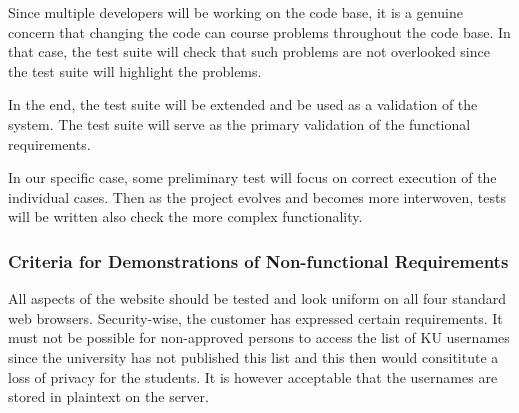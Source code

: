 \documentclass[11pt,a4paper]{report}
\begin{document}
Since multiple developers will be working on the code base, it is a genuine concern that changing the code can course problems throughout the code base. In that case, the test suite will check that such problems are not overlooked since the test suite will highlight the problems.

In the end, the test suite will be extended and be used as a validation of the system. The test suite will serve as the primary validation of the functional requirements.

In our specific case, some preliminary test will focus on correct execution of the individual cases. Then as the project evolves and becomes more interwoven, tests will be written also check the more complex functionality.

\subsubsection{Criteria for Demonstrations of Non-functional Requirements}
All aspects of the website should be tested and look uniform on all four standard web browsers.
Security-wise, the customer has expressed certain requirements. It must not be possible for non-approved persons to access the list of KU usernames since the university has not published this list and this then would consititute a loss of privacy for the students. It is however acceptable that the usernames are stored in plaintext on the server.
\end{document}
